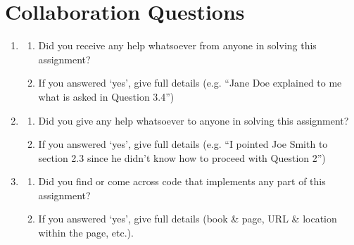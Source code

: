 \section{Collaboration Questions}

\begin{enumerate}
    \item 
    \begin{enumerate}
        \item Did you receive any help whatsoever from anyone in solving this assignment? 

        \item If you answered `yes', give full details (e.g. “Jane Doe explained to me what is asked in Question 3.4”)\\
        
        \begin{tcolorbox}[fit,height=4cm, width=15cm, blank, borderline={1pt}{-2pt},nobeforeafter]
        
        
        \end{tcolorbox}
        
    \end{enumerate}
    
    
    \item 
    \begin{enumerate}
        \item Did you give any help whatsoever to anyone in solving this assignment? 

        
        \item If you answered `yes', give full details (e.g. “I pointed Joe Smith to section 2.3 since he didn’t know how to proceed with Question 2”)\\
        
        \begin{tcolorbox}[fit,height=4cm, width=15cm, blank, borderline={1pt}{-2pt},nobeforeafter]
        
        
        \end{tcolorbox}
        
    \end{enumerate}
    
    \item 
    \begin{enumerate}
        \item Did you find or come across code that implements any part of this assignment?

        
        \item If you answered `yes', give full details (book \& page, URL \& location within the page, etc.).\\
        
        \begin{tcolorbox}[fit,height=4cm, width=15cm, blank, borderline={1pt}{-2pt},nobeforeafter]
        
        
        \end{tcolorbox}
        
    \end{enumerate}
\end{enumerate}